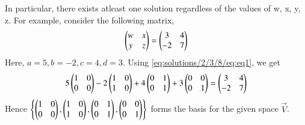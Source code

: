 In particular, there exists atleast one solution regardless of the values of w, x, y, z.
For example, consider the following matrix,
\begin{align}
	\begin{pmatrix}w & x\\ y & z\end{pmatrix} = \begin{pmatrix}3 & 4 \\ -2 & 7\end{pmatrix}
\end{align}
Here, $a = 5, b = -2, c = 4, d = 3$. Using \eqref{eq:solutions/2/3/8/eq:eq1}, we get
\begin{align}
	5\begin{pmatrix}1& 0\\0 & 0\end{pmatrix} - 2\begin{pmatrix}1 & 0\\1 & 0\end{pmatrix} + 4\begin{pmatrix}0& 1\\0 & 1\end{pmatrix} + 3\begin{pmatrix}0 & 0\\0 & 1\end{pmatrix} = \begin{pmatrix}3 & 4 \\ -2 & 7\end{pmatrix}
\end{align}
Hence $\left\{\begin{pmatrix}1 & 0\\0 & 0\end{pmatrix}, \begin{pmatrix}1 & 0\\1 & 0\end{pmatrix}, \begin{pmatrix}0& 1\\0 & 1\end{pmatrix}, \begin{pmatrix}0 & 0\\0 & 1\end{pmatrix}\right\}$ forms the basis for the given space $\vec{V}$.
